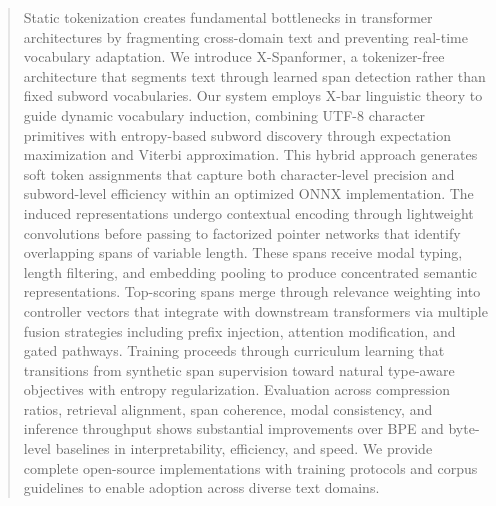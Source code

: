 \begin{abstract}
	Static tokenization creates fundamental bottlenecks in transformer architectures by fragmenting cross-domain text and preventing real-time vocabulary adaptation. We introduce X-Spanformer, a tokenizer-free architecture that segments text through learned span detection rather than fixed subword vocabularies. Our system employs X-bar linguistic theory to guide dynamic vocabulary induction, combining UTF-8 character primitives with entropy-based subword discovery through expectation maximization and Viterbi approximation. This hybrid approach generates soft token assignments that capture both character-level precision and subword-level efficiency within an optimized ONNX implementation. The induced representations undergo contextual encoding through lightweight convolutions before passing to factorized pointer networks that identify overlapping spans of variable length. These spans receive modal typing, length filtering, and embedding pooling to produce concentrated semantic representations. Top-scoring spans merge through relevance weighting into controller vectors that integrate with downstream transformers via multiple fusion strategies including prefix injection, attention modification, and gated pathways. Training proceeds through curriculum learning that transitions from synthetic span supervision toward natural type-aware objectives with entropy regularization. Evaluation across compression ratios, retrieval alignment, span coherence, modal consistency, and inference throughput shows substantial improvements over BPE and byte-level baselines in interpretability, efficiency, and speed. We provide complete open-source implementations with training protocols and corpus guidelines to enable adoption across diverse text domains.
\end{abstract}
